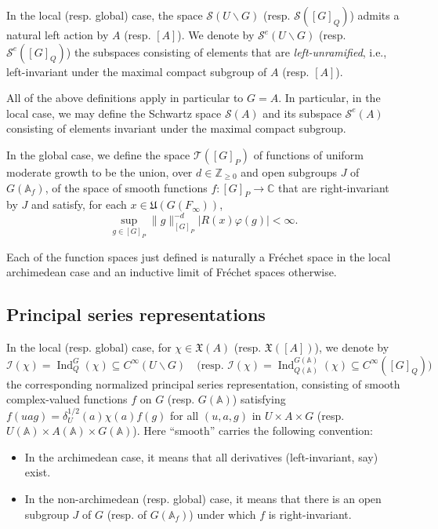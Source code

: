 \documentclass[reqno]{amsart}
\DeclareMathOperator{\Ind}{Ind}
\theoremstyle{plain} \newtheorem{theorem} {Theorem}
\theoremstyle{definition} \newtheorem{definition} [theorem] {Definition}
\theoremstyle{itplain} %
\numberwithin{equation}{section}
\numberwithin{theorem}{section}
\renewcommand{\geq}{\geqslant}
\begin{document}
In the local (resp. global) case, the space $\mathcal{S}(U \backslash G)$ (resp. $\mathcal{S}([G]_Q)$) admits a natural left action by $A$ (resp. $[A]$).  We denote by $\mathcal{S}^e(U \backslash G)$ (resp. $\mathcal{S}^e([G]_Q)$) the subspaces consisting of elements that are \emph{left-unramified}, i.e., left-invariant under the maximal compact subgroup of $A$ (resp. $[A]$).  

All of the above definitions apply in particular to $G = A$.  In particular, in the local case, we may define the Schwartz space $\mathcal{S}(A)$ and its subspace $\mathcal{S}^e(A)$ consisting of elements invariant under the maximal compact subgroup.  

In the global case, we define the space $\mathcal{T}([G]_P)$ of functions of uniform moderate growth to be the union, over $d \in \mathbb{Z}_{\geq 0}$ and open subgroups $J$ of $G(\mathbb{A}_f)$, of the space of smooth functions $f : [G]_P \rightarrow \mathbb{C}$ that are right-invariant by $J$ and satisfy, for each $x \in \mathfrak{U}(G(F_\infty))$,
\begin{equation*}
  \sup_{g \in [G]_P} \|g\|^{-d}_{[G]_P} | R(x) \varphi(g)| < \infty.
\end{equation*}

Each of the function spaces just defined is naturally a Fr{\'e}chet space in the local archimedean case and an inductive limit of Fr{\'e}chet spaces otherwise.


\subsection{Principal series representations}\label{sec:induc-repr}
In the local (resp. global) case, for $\chi \in \mathfrak{X}(A)$ (resp. $\mathfrak{X}([A])$), we denote by 
\begin{equation*}
  \mathcal{I}(\chi) = \Ind_Q^G(\chi) \subseteq C^\infty(U \backslash G)
  \quad
  \text{
    (resp. $\mathcal{I}(\chi) = \Ind_{Q(\mathbb{A})}^{G(\mathbb{A})}(\chi) \subseteq C^\infty([G]_Q)$)
  }
\end{equation*}
the corresponding normalized principal series representation, consisting of smooth complex-valued functions $f$ on $G$ (resp. $G(\mathbb{A})$) satisfying $f(u a g) = \delta_U^{1/2}(a) \chi(a) f(g)$ for all $(u,a,g)$ in $U \times A \times G$ (resp. $U(\mathbb{A}) \times A(\mathbb{A}) \times G(\mathbb{A})$).  Here ``smooth'' carries the following convention:
\begin{itemize}
\item In the archimedean case, it means that all derivatives (left-invariant, say) exist.
\item In the non-archimedean (resp. global) case, it means that there is an open subgroup $J$ of $G$ (resp. of $G(\mathbb{A}_f)$) under which $f$ is right-invariant.
\end{itemize}
\end{document}
